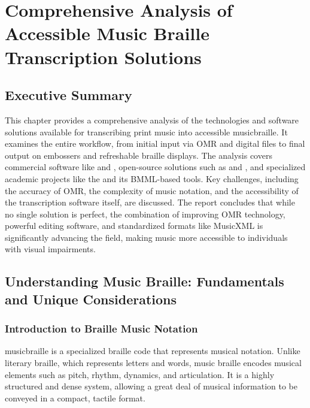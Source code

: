 \chapter{Comprehensive Analysis of Accessible Music Braille Transcription Solutions}\label{ch10:music-braille}
\raggedright

\section{Executive Summary}\label{ch10:sec:executive-summary}
This chapter provides a comprehensive analysis of the technologies and software solutions available for transcribing print music into accessible \gls{musicbraille}. It examines the entire workflow, from initial input via \gls{OMR} and digital files to final output on embossers and refreshable braille displays. The analysis covers commercial software like  and , open-source solutions such as  and , and specialized academic projects like the  and its \gls{BMML}-based tools. Key challenges, including the accuracy of OMR, the complexity of music notation, and the accessibility of the transcription software itself, are discussed. The report concludes that while no single solution is perfect, the combination of improving OMR technology, powerful editing software, and standardized formats like \gls{MusicXML} is significantly advancing the field, making music more accessible to individuals with visual impairments.

\section{Understanding Music Braille: Fundamentals and Unique Considerations}\label{ch10:sec:understanding-music-braille}

\subsection{Introduction to Braille Music Notation}\label{ch10:ssec:intro-to-music-braille}
\gls{musicbraille} is a specialized braille code that represents musical notation. Unlike literary braille, which represents letters and words, music braille encodes musical elements such as pitch, rhythm, dynamics, and articulation. It is a highly structured and dense system, allowing a great deal of musical information to be conveyed in a compact, tactile format.

